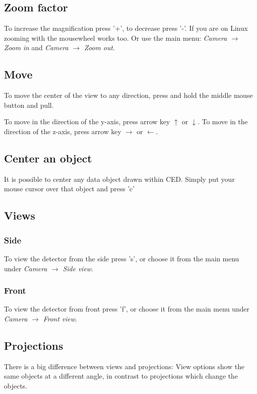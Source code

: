 \documentclass[a4paper,10pt]{article}
\begin{document}
\subsection{Zoom factor}
To increase the magnification press '+', to decrease press '-'. If you are on Linux zooming with the mousewheel works too. 
Or use the main menu: \textit{Camera $\rightarrow$ Zoom in} and \textit{Camera $\rightarrow$ Zoom out}. 

\subsection{Move}
To move the center of the view to any direction, press and hold the middle mouse button and pull. 

To move in the direction of the y-axis, press arrow key $\uparrow$ or $\downarrow$. 
To move in the direction of the z-axis, press arrow key $\to$ or $\leftarrow$. 

\subsection{Center an object}
It is possible to center any data object drawn within CED. Simply put your mouse cursor over that object and press 'c' 

\subsection{Views}
\subsubsection{Side}
To view the detector from the side press 's', or choose it from the main menu under \textit{Camera $\to$ Side view}.

\subsubsection{Front}
To view the detector from front press 'f', or choose it from the main menu under \textit{Camera $\to$ Front view}.

\subsection{Projections}
There is a big difference between views and projections: View options show the same objects at a different angle, in contrast to projections which change the objects. 
\end{document}
